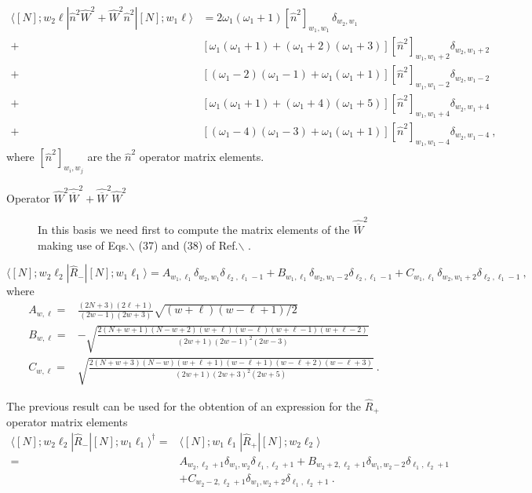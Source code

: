 \documentclass[a4paper,12pt,captions=tableheading]{article}
\begin{document}
\begin{align}
\langle [N];w_2 \ell|\hat n^2 \hat W^2 + \hat W^2 \hat n^2|[N];w_1 \ell\rangle &=
 2\omega_1(\omega_1+1) [\hat n^2]_{w_1,w_1}\, \delta_{w_2,w_1} \nonumber\\
+& \left[\omega_1(\omega_1+1) + (\omega_1 +2)(\omega_1+3)\right][\hat n^2]_{w_1,w_1+2}\delta_{w_2,w_1+2}\nonumber\\
+& \left[(\omega_1 - 2)(\omega_1-1) + \omega_1 (\omega_1+1)\right][\hat n^2]_{w_1,w_1-2}\delta_{w_2,w_1-2}\label{n2W2matel_so3}\\
+& \left[\omega_1(\omega_1+1) + (\omega_1 +4)(\omega_1+5)\right][\hat n^2]_{w_1,w_1+4}\delta_{w_2,w_1+4}\nonumber\\
+& \left[(\omega_1 - 4)(\omega_1-3) + \omega_1 (\omega_1+1)\right][\hat n^2]_{w_1,w_1-4}\delta_{w_2,w_1-4}\nonumber~,
\end{align}
\noindent where \([\hat n^2]_{w_i,w_j}\) are the \(\hat n^2\) operator matrix elements.

\begin{description}
\item[{Operator \(\hat W^2 \hat{\overline{W}}^2 + \hat{\overline{W}}^2\hat W^2 \)}] In
this basis we need first to compute the matrix elements of the \(\hat{\overline{W}}^2\) making use of Eqs.$\backslash$ (37) and (38) of Ref.$\backslash$ \cite{PBernal2008}.
\end{description}
\begin{equation}
\langle [N];w_2 \ell_2|\hat R_{-}|[N];w_1 \ell_1\rangle = A_{w_1,\ell_1}  \delta_{w_2,w_1} \delta_{\ell_2,\ell_1-1} + B_{w_1,\ell_1}  \delta_{w_2,w_1-2} \delta_{\ell_2,\ell_1-1} + C_{w_1,\ell_1}  \delta_{w_2,w_1+2} \delta_{\ell_2,\ell_1-1}~,
\end{equation}
\noindent where 
\begin{align}
A_{w,\ell} = & \frac{(2N+3)(2\ell + 1)}{(2w-1)(2w+3)} \sqrt{(w+\ell)(w-\ell+1)/2}\nonumber\\ 
B_{w,\ell} = & -\sqrt{\frac{2(N+w+1)(N-w+2)(w+\ell)(w-\ell)(w+\ell-1)(w+\ell-2)}{(2w+1)(2w-1)^2(2w-3)}}\nonumber\\ 
C_{w,\ell} = & \sqrt{\frac{2(N+w+3)(N-w)(w+\ell+1)(w-\ell+1)(w-\ell+2)(w-\ell+3)}{(2w+1)(2w+3)^2(2w+5)}}\nonumber~.
\end{align}

The previous result can be used for the obtention of an expression for the \(\hat R_{+}\) operator matrix elements
\begin{align}
\langle [N];w_2 \ell_2|\hat R_{-}|[N];w_1 \ell_1\rangle^\dagger =& \langle [N];w_1 \ell_1|\hat R_{+}|[N];w_2 \ell_2\rangle \\
=& A_{w_2,\ell_2+1}  \delta_{w_1,w_2} \delta_{\ell_1,\ell_2+1} + B_{w_2+2,\ell_2+1}  \delta_{w_1,w_2-2} \delta_{\ell_1,\ell_2+1}  \nonumber \\ & + C_{w_2-2,\ell_2+1}  \delta_{w_1,w_2+2} \delta_{\ell_1,\ell_2+1}~.\nonumber
\end{align}
\end{document}
